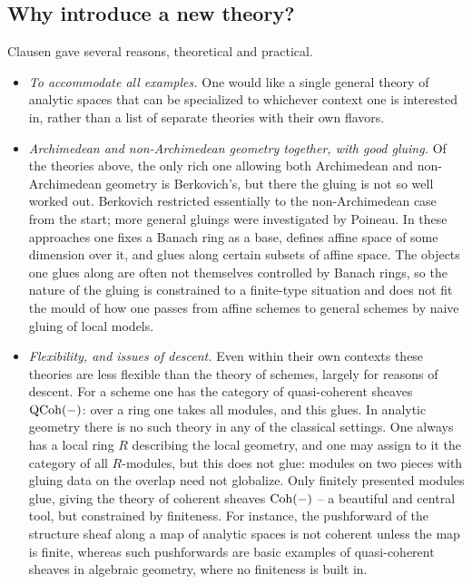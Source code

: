 \subsection{Why introduce a new theory?}

Clausen gave several reasons, theoretical and practical.

\begin{itemize}
\item \emph{To accommodate all examples.} One would like a single general theory
of analytic spaces that can be specialized to whichever context one is interested
in, rather than a list of separate theories with their own flavors.

\item \emph{Archimedean and non-Archimedean geometry together, with good
gluing.} Of the theories above, the only rich one allowing both Archimedean and
non-Archimedean geometry is Berkovich's, but there the gluing is not so well
worked out. Berkovich restricted essentially to the non-Archimedean case from the
start; more general gluings were investigated by Poineau. In these approaches one
fixes a Banach ring as a base, defines affine space of some dimension over it,
and glues along certain subsets of affine space. The objects one glues along are
often not themselves controlled by Banach rings, so the nature of the gluing is
constrained to a finite-type situation and does not fit the mould of how one
passes from affine schemes to general schemes by naive gluing of local models.

\item \emph{Flexibility, and issues of descent.} Even within their own contexts
these theories are less flexible than the theory of schemes, largely for reasons
of descent. For a scheme one has the category of quasi-coherent sheaves
$\operatorname{QCoh}(-)$: over a ring one takes all modules, and this glues. In analytic
geometry there is no such theory in any of the classical settings. One always has
a local ring $R$ describing the local geometry, and one may assign to it the
category of all $R$-modules, but this does not glue: modules on two pieces with
gluing data on the overlap need not globalize. Only finitely presented modules
glue, giving the theory of coherent sheaves $\operatorname{Coh}(-)$ -- a beautiful and
central tool, but constrained by finiteness. For instance, the pushforward of the
structure sheaf along a map of analytic spaces is not coherent unless the map is
finite, whereas such pushforwards are basic examples of quasi-coherent sheaves in
algebraic geometry, where no finiteness is built in.


\end{itemize}
